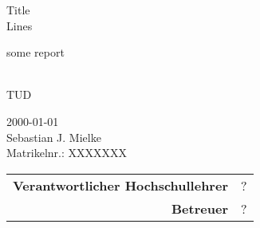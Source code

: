 \documentclass[fontsize=12pt, paper=a4, twoside=false, parskip=half+, pagesize=auto, numbers=noenddot, open=right, toc=listof, toc=bibliography, fleqn]{scrreprt}
\begin{document}
\thispagestyle{empty}

\begin{center}
	\vspace*{5mm}
	{\Huge Title\\[.25\baselineskip]Lines}\\
	\vspace{15mm}
	
	{\Large some report}\\\\
	
	\vspace{50mm}
	\begin{large}
		TUD\\
	\end{large}
	\vspace{20mm}
	2000-01-01\\
	\vspace{20mm}
	Sebastian J. Mielke \\
	Matrikelnr.: XXXXXXX\\
	\vspace{30mm}
	\begin{tabular}{rl}
		{\bfseries Verantwortlicher Hochschullehrer} & ?\\
		{\bfseries Betreuer} & ?\\
	\end{tabular}
\end{center}

\clearpage
{}

\tableofcontents

\clearpage



\clearpage

\appendix


\clearpage

\printbibliography
\end{document}
